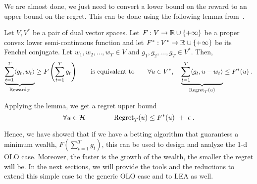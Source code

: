 We are almost done, we just need to convert a lower bound on the reward to an upper bound
on the regret. This can be done using the following lemma from~\cite{McMahanO14}.
\begin{lemma}
\label{lemma:reward-regret}
Let $V,V^*$ be a pair of dual vector spaces. Let $F:V \to \mathbb{R} \cup \{+\infty\}$
be a proper convex lower semi-continuous function and let $F^*:V^* \to \mathbb{R} \cup
\{+\infty\}$ be its Fenchel conjugate. Let $w_1, w_2, \dots, w_T \in V$ and
$g_1, g_2, \dots, g_T \in V^*$.  Then,
\[
\underbrace{\sum_{t=1}^T \langle g_t, w_t \rangle}_{\operatorname{Reward}_T} \ge F\left( \sum_{t=1}^T g_t \right)
\qquad \text{is equivalent to} \qquad
\forall u \in V^*, \quad
\underbrace{\sum_{t=1}^T \langle g_t, u - w_t\rangle}_{\operatorname{Regret}_T(u)} \le F^*(u) \; .
\]
\end{lemma}

Applying the lemma, we get a regret upper bound
\[
\forall u \in \mathcal{H} \qquad \qquad
\operatorname{Regret}_T(u) \le F^*(u) \ + \ \epsilon \; .
\]

Hence, we have showed that if we have a betting algorithm that guarantess a minimum wealth, $F(\sum_{t=1}^T g_t)$, this can be used to design and analyze the 1-d \ac{OLO} case. Moreover, the faster is the growth of the wealth, the smaller the regret will be.
In the next sections, we will provide the tools and the reductions to extend this simple case to the generic \ac{OLO} case and to \ac{LEA} as well.